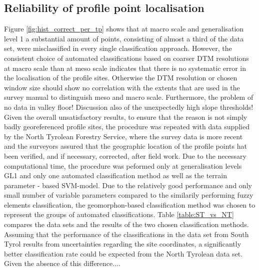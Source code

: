 \documentclass[final,1p,times,twocolumn,authoryear]{elsarticle}
\begin{document}
\subsection{Reliability of profile point localisation} 
Figure \ref{fig:hist_correct_per_tp} shows that at macro scale and generalisation level 1 a substantial amount of points, consisting of almost a third of the data set, were misclassified in every single classification approach. However, the consistent choice of automated classifications based on coarser  DTM resolutions at macro scale than at meso scale indicates that there is no systematic error in the localisation of the profile sites. Otherwise the DTM resolution or chosen window size should show no correlation with the extents that are used in the survey manual to distinguish meso and macro scale. 
Furthermore, the problem of no data in valley floor! Discussion also of the unexpectedly high slope thresholds!
Given the overall unsatisfactory results, to ensure that the reason is not simply badly georeferenced profile sites, the procedure was repeated with data supplied by the North Tyrolean Forestry Service, where the survey data is more recent and the surveyors assured that the geographic location of the profile points hat been verified, and if necessary, corrected, after field work. Due to the necessary computational time, the procedure was peformed only at generalisation levels GL1 and only one automated classification method as well as the terrain parameter - based SVM-model. Due to the relatively good performance and only small number of variable parameters compared to the similarily performing fuzzy elements classification, the geomorphon-based classification method was chosen to represent the groups of automated classifications. Table \ref{table:ST_vs_NT} compares the data sets and the results of the two chosen classification methods. Assuming that the performance of the classifications in the data set from South Tyrol results from uncertainties regarding the site coordinates, a significantly better classification rate could be expected from the North Tyrolean data set. Given the absence of this difference....
\end{document}
